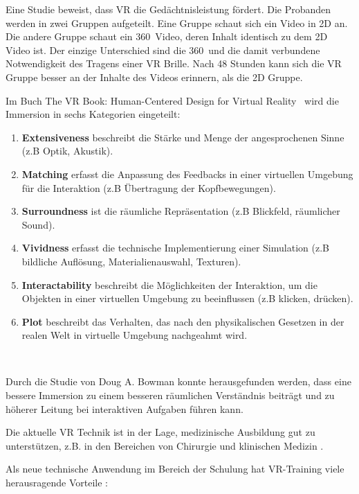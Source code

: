 Eine Studie \citep{30} beweist, dass VR die Gedächtnisleistung fördert. Die Probanden werden in zwei Gruppen aufgeteilt. Eine Gruppe schaut sich ein Video in 2D an. Die andere Gruppe schaut ein 360\degree\ Video, deren Inhalt identisch zu dem 2D Video ist. Der einzige Unterschied sind die 360\degree\ und die damit verbundene Notwendigkeit des Tragens einer VR Brille. Nach 48 Stunden kann sich die VR Gruppe besser an der Inhalte des Videos erinnern, als die 2D Gruppe.

Im Buch \glqq The VR Book: Human-Centered Design for Virtual Reality\grqq\ \citep{28} wird die Immersion in sechs Kategorien eingeteilt: 

\begin{enumerate}
\item \textbf{Extensiveness} beschreibt die Stärke und Menge der angesprochenen Sinne (z.B Optik, Akustik).
\item \textbf{Matching} erfasst die Anpassung des Feedbacks in einer virtuellen Umgebung für die Interaktion (z.B Übertragung der Kopfbewegungen).
\item \textbf{Surroundness} ist die räumliche Repräsentation (z.B Blickfeld, räumlicher Sound).
\item \textbf{Vividness} erfasst die technische Implementierung einer Simulation (z.B bildliche Auflösung, Materialienauswahl, Texturen).
\item \textbf{Interactability} beschreibt die Möglichkeiten der Interaktion, um die Objekten in einer virtuellen Umgebung zu beeinflussen (z.B klicken, drücken).
\item \textbf{Plot} beschreibt das Verhalten, das nach den physikalischen Gesetzen in der realen Welt in virtuelle Umgebung nachgeahmt wird.
\end{enumerate}\

Durch die Studie von Doug A. Bowman \citep{27} konnte herausgefunden werden, dass eine bessere Immersion zu einem besseren räumlichen Verständnis beiträgt und zu höherer Leitung bei interaktiven Aufgaben führen kann.

Die aktuelle VR Technik ist in der Lage, medizinische Ausbildung gut zu unterstützen, z.B. in den Bereichen von Chirurgie \citep{58} und klinischen Medizin \citep{59}.

Als neue technische Anwendung im Bereich der Schulung hat VR-Training viele herausragende Vorteile \citep{15}:

